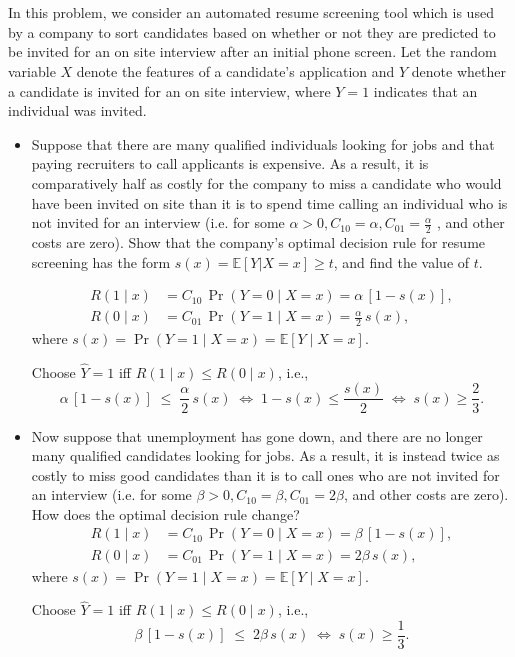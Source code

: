 \documentclass[a4paper]{article}
\begin{document}
\section{}
In this problem, we consider an automated resume screening tool which is used by a company to sort candidates based on whether or not they are predicted to be invited for an on site interview after an initial phone screen.
Let the random variable $X$ denote the features of a candidate’s application and $Y$ denote whether a candidate is invited for an on site interview, where $Y = 1$ indicates that an individual was invited.
\begin{itemize}
    \item  Suppose that there are many qualified individuals looking for jobs and that paying recruiters to call applicants is expensive.
        As a result, it is comparatively half as costly for the company to miss a candidate who would have been invited on site than it is to spend time calling an individual who is not invited for an interview (i.e. for some $\alpha > 0, C_{10} = \alpha, C_{01} = \frac{\alpha}{2}$ , and other costs are zero).
        Show that the company’s optimal decision rule for resume screening has the form $s(x) = \mathbb{E}[Y |X = x] \geq t$, and find the value of $t$.

        $$\begin{aligned}
R(1\mid x) &= C_{10}\,\Pr(Y=0\mid X=x)=\alpha\,[1-s(x)],\\
R(0\mid x) &= C_{01}\,\Pr(Y=1\mid X=x)=\frac{\alpha}{2}\,s(x),
\end{aligned}$$
where $s(x)=\Pr(Y=1\mid X=x)=\mathbb{E}[Y\mid X=x]$.

Choose $\hat Y=1$ iff $R(1\mid x)\le R(0\mid x)$, i.e.,
\[
\alpha\,[1-s(x)] \;\le\; \frac{\alpha}{2}\,s(x)
\;\Longleftrightarrow\;
1-s(x)\le \frac{s(x)}{2}
\;\Longleftrightarrow\;
s(x)\ge \frac{2}{3}.
\]

    \item Now suppose that unemployment has gone down, and there are no longer many qualified candidates looking for jobs.
        As a result, it is instead twice as costly to miss good candidates than it is to call ones who are not invited for an interview (i.e. for some $\beta > 0, C_{10} = \beta, C_{01} = 2\beta$, and other costs are zero).
        How does the optimal decision rule change?
        $$\begin{aligned}
R(1\mid x) &= C_{10}\,\Pr(Y=0\mid X=x)=\beta\,[1-s(x)],\\
R(0\mid x) &= C_{01}\,\Pr(Y=1\mid X=x)=2\beta\,s(x),
\end{aligned}$$
where $s(x)=\Pr(Y=1\mid X=x)=\mathbb{E}[Y\mid X=x]$.

Choose $\hat Y=1$ iff $R(1\mid x)\le R(0\mid x)$, i.e.,
\[
\beta\,[1-s(x)] \;\le\; 2\beta\,s(x)
\;\Longleftrightarrow\;
s(x)\ge \frac{1}{3}.
\]

\end{itemize}
\end{document}
